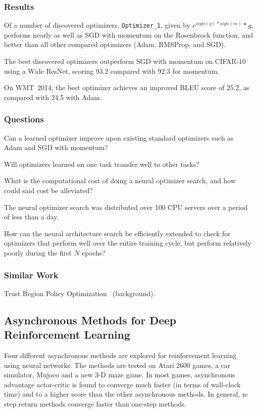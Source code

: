 \documentclass[a4paper, 12pt]{article}
\begin{document}
\subsubsection{Results}

Of a number of discovered optimizers, \verb|Optimizer_1|, given by $e^{sign(g)
* sign(m)} * g$, performs nearly as well as SGD with momentum on the Rosenbrock
function, and better than all other compared optimizers (Adam, RMSProp, and
SGD).

The best discovered optimizers outperform SGD with momentum on CIFAR-10 using a
Wide ResNet, scoring 93.2 compared with 92.3 for momentum.

On WMT~2014, the best optimizer achieves an improved BLEU score of 25.2, as
compared with 24.5 with Adam.

\subsubsection{Questions}

Can a learned optimizer improve upon existing standard optimizers such as Adam
and SGD with momentum?

Will optimizers learned on one task transfer well to other tasks?

What is the computational cost of doing a neural optimizer search, and how
could said cost be alleviated?

The neural optimizer search was distributed over \num{100} CPU servers over a
period of less than a day.

How can the neural architecture search be efficiently extended to check for
optimizers that perform well over the entire training cycle, but perform
relatively poorly during the first $N$ epochs?

\subsubsection{Similar Work}

Trust Region Policy Optimization~\citet{DBLP:journals/corr/SchulmanLMJA15}
(background).


\subsection{Asynchronous Methods for Deep Reinforcement
            Learning~\citet{DBLP:journals/corr/MnihBMGLHSK16}}

Four different asynchronous methods are explored for reinforcement learning
using neural networks. The methods are tested on Atari 2600 games, a car
simulator, Mujoco and a new 3-D maze game. In most games, asynchronous
advantage actor-critic is found to converge much faster (in terms of wall-clock
time) and to a higher score than the other asynchronous methods. In general,
n-step return methods converge faster than one-step methods.
\end{document}
